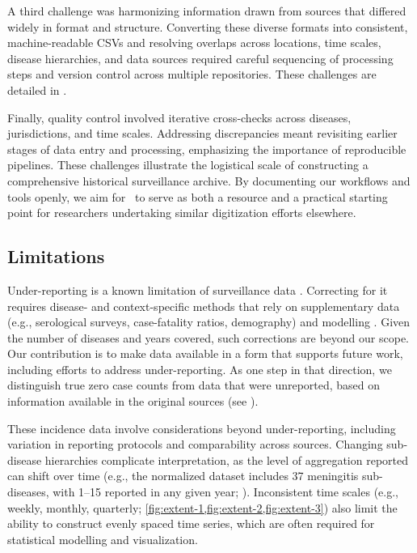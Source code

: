 \documentclass[12pt]{article}
\begin{document}
A third challenge was harmonizing information drawn from sources that differed widely in format and structure. Converting these diverse formats into consistent, machine-readable CSVs and resolving overlaps across locations, time scales, disease hierarchies, and data sources required careful sequencing of processing steps and version control across multiple repositories. These challenges are detailed in .

Finally, quality control involved iterative cross-checks across diseases, jurisdictions, and time scales. Addressing discrepancies meant revisiting earlier stages of data entry and processing, emphasizing the importance of reproducible pipelines. These challenges illustrate the logistical scale of constructing a comprehensive historical surveillance archive. By documenting our workflows and tools openly, we aim for \datacronym\ to serve as both a resource and a practical starting point for researchers undertaking similar digitization efforts elsewhere.

\subsection{Limitations}\label{sec:limitations}

Under-reporting is a known limitation of surveillance data \cite{van2013contagious,gibbons2014measuring}. Correcting for it requires disease- and context-specific methods that rely on supplementary data (e.g., serological surveys, case-fatality ratios, demography) and modelling \cite{mangen2011current}. Given the number of diseases and years covered, such corrections are beyond our scope. Our contribution is to make data available in a form that supports future work, including efforts to address under-reporting. As one step in that direction, we distinguish true zero case counts from data that were unreported, based on information available in the original sources (see ).

These incidence data involve considerations beyond under-reporting, including variation in reporting protocols and comparability across sources. Changing sub-disease hierarchies complicate interpretation, as the level of aggregation reported can shift over time (e.g., the normalized dataset includes 37 meningitis sub-diseases, with 1--15 reported in any given year; ). Inconsistent time scales (e.g., weekly, monthly, quarterly; \cref{fig:extent-1,fig:extent-2,fig:extent-3}) also limit the ability to construct evenly spaced time series, which are often required for statistical modelling and visualization.
\end{document}

